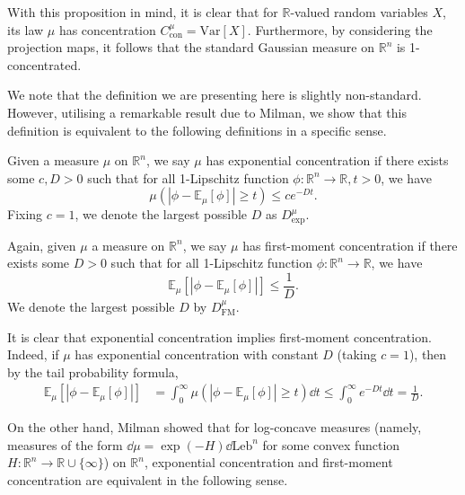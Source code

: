 With this proposition in mind, it is clear that for \(\mathbb{R}\)-valued random variables \(X\), 
its law \(\mu\) has concentration \(C^\mu_{\text{con}} = \text{Var}[X]\). Furthermore, by 
considering the projection maps, it follows that the standard Gaussian measure on \(\mathbb{R}^n\) 
is 1-concentrated.

We note that the definition we are presenting here is slightly non-standard. However, utilising a 
remarkable result due to Milman, we show that this definition is equivalent to the following 
definitions in a specific sense.

\begin{definition}
  Given a measure \(\mu\) on \(\mathbb{R}^n\), we say \(\mu\) has exponential concentration if 
  there exists some \(c, D > 0\) such that for all 1-Lipschitz function 
  \(\phi : \mathbb{R}^n \to \mathbb{R}, t > 0\), we have
  \begin{equation}
    \mu(|\phi - \mathbb{E}_\mu[\phi]| \ge t) \le c e^{-Dt}.
  \end{equation}
  Fixing \(c = 1\), we denote the largest possible \(D\) as \(D^\mu_{\text{exp}}\).
\end{definition}

\begin{definition}
  Again, given \(\mu\) a measure on \(\mathbb{R}^n\), we say \(\mu\) has first-moment concentration 
  if there exists some \(D > 0\) such that for all 1-Lipschitz function 
  \(\phi : \mathbb{R}^n \to \mathbb{R}\), we have
  \begin{equation}
    \mathbb{E}_\mu[|\phi - \mathbb{E}_\mu[\phi]|] \le \frac{1}{D}.
  \end{equation}
  We denote the largest possible \(D\) by \(D^\mu_{\text{FM}}\).
\end{definition}

It is clear that exponential concentration implies first-moment concentration. Indeed, if \(\mu\) 
has exponential concentration with constant \(D\) (taking \(c = 1\)), then by the tail probability formula,
\begin{align*}
  \mathbb{E}_\mu[|\phi - \mathbb{E}_\mu[\phi]|] 
  & = \int_0^\infty \mu(|\phi - \mathbb{E}_\mu[\phi]| \ge t) \dd t \le \int_0^\infty e^{-Dt} \dd t 
   = \frac{1}{D}.
\end{align*}

On the other hand, Milman showed that for log-concave measures (namely, measures of the form 
\(\dd \mu = \exp(-H)\dd\text{Leb}^n\) for some convex function 
\(H : \mathbb{R}^n \to \mathbb{R} \cup \{\infty\}\)) on \(\mathbb{R}^n\), exponential concentration 
and first-moment concentration are equivalent in the following sense. 


